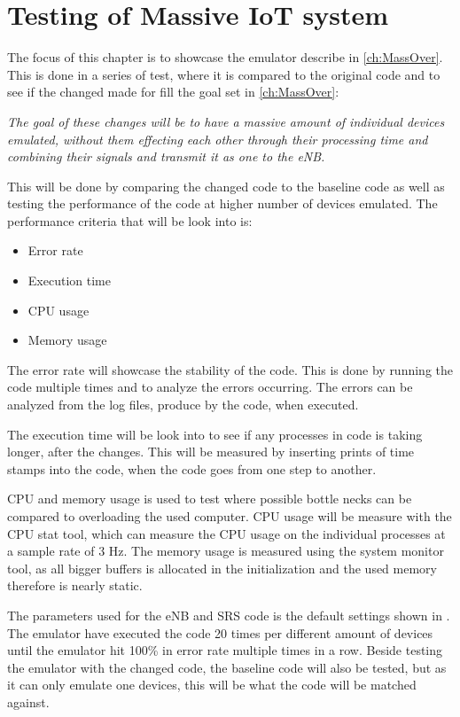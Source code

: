 \chapter{Testing of Massive IoT system} \label{ch:mass_test}
The focus of this chapter is to showcase the emulator describe in \autoref{ch:MassOver}. This is done in a series of test, where it is compared to the original code and to see if the changed made for fill the goal set in \autoref{ch:MassOver}:

\textit{The goal of these changes will be to have a massive amount of individual devices emulated, without them effecting each other through their processing time and combining their signals and transmit it as one to the eNB.}

This will be done by comparing the changed code to the baseline code as well as testing the performance of the code at higher number of devices emulated.
The performance criteria that will be look into is:

\begin{itemize}
\item Error rate
\item Execution time
\item CPU usage
\item Memory usage
\end{itemize}

The error rate will showcase the stability of the code. This is done by running the code multiple times and to analyze the errors occurring. The errors can be analyzed from the log files, produce by the code, when executed.

The execution time will be look into to see if any processes in code is taking longer, after the changes. This will be measured by inserting prints of time stamps into the code, when the code goes from one step to another. 

CPU and memory usage is used to test where possible bottle necks can be compared to overloading the used computer. CPU usage will be measure with the CPU stat tool, which can measure the CPU usage on the individual processes at a sample rate of 3 Hz. The memory usage is measured using the system monitor tool, as all bigger buffers is allocated in the initialization and the used memory therefore is nearly static. 

The parameters used for the eNB and SRS code is the default settings shown in . The emulator have executed the code 20 times per different amount of devices until the emulator hit 100\% in error rate multiple times in a row. Beside testing the emulator with the changed code, the baseline code will also be tested, but as it can only emulate one devices, this will be what the code will be matched against.

